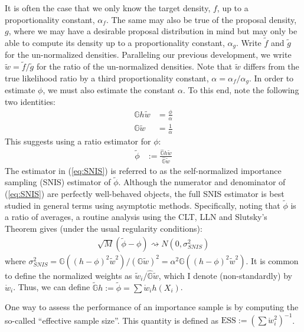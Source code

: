\documentclass[11pt, oneside]{article}   	%
\newcommand{\bG}{\mathbb{G}}
\newcommand{\wcirc}{\mathring{w}}
\begin{document}
It is often the case that we only know the target density, $f$, up to a proportionality constant, $\alpha_f$. The same may also be true of the proposal density, $g$, where we may have a desirable proposal distribution in mind but may only be able to compute its density up to a proportionality constant, $\alpha_g$. Write $\tilde{f}$ and $\tilde{g}$ for the un-normalized densities. Paralleling our previous development, we write $\tilde{w} = \tilde{f} / \tilde{g}$ for the ratio of the un-normalized densities. Note that $\tilde{w}$ differs from the true likelihood ratio by a third proportionality constant, $\alpha = \alpha_f / \alpha_g$. In order to estimate $\phi$, we must also estimate the constant $\alpha$. To this end, note the following two identities:
%
\begin{align}
    \bG h \tilde{w} &= \frac{\phi}{\alpha}\\
    \bG \tilde{w} &= \frac{1}{\alpha}
\end{align}
%
This suggests using a ratio estimator for $\phi$:
%
\begin{align}
    \tilde{\phi} &:= \frac{\hat{\bG} h \tilde{w}}{\hat{\bG} \tilde{w}} \label{eq:SNIS}
\end{align}
%
The estimator in (\ref{eq:SNIS}) is referred to as the self-normalized importance sampling (SNIS) estimator of $\tilde{\phi}$. Although the numerator and denominator of (\ref{eq:SNIS}) are perfectly well-behaved objects, the full SNIS estimator is best studied in general terms using asymptotic methods. Specifically, noting that $\tilde{\phi}$ is a ratio of averages, a routine analysis using the CLT, LLN and Slutsky's Theorem \citep[p.91]{Cho20} gives (under the usual regularity conditions\footnotemark):
%
\begin{align}
    \sqrt{M} (\tilde{\phi} - \phi) \rightsquigarrow N(0, \sigma^2_{SNIS})
\end{align}
%
where $\sigma^2_{SNIS} = \bG ((h - \phi)^2 \tilde{w}^2) / (\bG \tilde{w})^2 =\alpha^2 \bG ((h - \phi)^2 \tilde{w}^2)$. It is common to define the normalized weights as $\tilde{w}_i / \hat{\bG} \tilde{w}$, which I denote (non-standardly) by $\mathring{w}_i$. Thus, we can define $\tilde{\bG} h := \tilde{\phi} = \sum \mathring{w}_i h(X_i)$.


One way to assess the performance of an importance sample is by computing the so-called ``effective sample size''. This quantity is defined as $\mathrm{ESS} := (\sum \wcirc_i^{2})^{-1}$.
\end{document}
